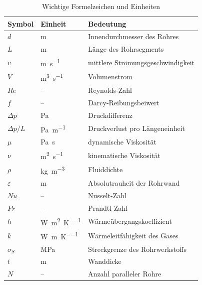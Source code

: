 ﻿\documentclass[12pt,a4paper,twoside]{article}
\theoremstyle{plain}
\theoremstyle{definition}
\theoremstyle{remark}
\newcommand{\Rey}{\mathit{Re}}
\newcommand{\Nus}{\mathit{Nu}}
\newcommand{\Pra}{\mathit{Pr}}
\newcommand{\dpL}{\Delta p / L}
\begin{document}
\begin{table}[htbp]
\centering
\caption{Wichtige Formelzeichen und Einheiten}
\label{tab:nomenklatur}
\begin{tabularx}{\linewidth}{@{}llX@{}}
\toprule
Symbol & Einheit & Bedeutung \\
\midrule
$d$     & \si{\metre}                 & Innendurchmesser des Rohres \\
$L$     & \si{\metre}                 & Länge des Rohrsegments \\
$v$     & \si{\metre\per\second}      & mittlere Strömungsgeschwindigkeit \\
$\dot{V}$ & \si{\metre\cubed\per\second} & Volumenstrom \\
$\Rey$  & --                          & Reynolds-Zahl \\
$f$     & --                          & Darcy-Reibungsbeiwert \\
$\Delta p$ & \si{\pascal}            & Druckdifferenz \\
$\dpL$  & \si{\pascal\per\metre}      & Druckverlust pro Längeneinheit \\
$\mu$   & \si{\pascal\second}         & dynamische Viskosität \\
$\nu$   & \si{\metre\squared\per\second} & kinematische Viskosität \\
$\rho$  & \si{\kilogram\per\metre\cubed} & Fluiddichte \\
$\varepsilon$ & \si{\metre}          & Absolutrauheit der Rohrwand \\
$\Nus$  & --                          & Nusselt-Zahl \\
$\Pra$  & --                          & Prandtl-Zahl \\
$h$     & \si{\watt\per\metre\squared\per\kelvin} & Wärmeübergangskoeffizient \\
$k$     & \si{\watt\per\metre\per\kelvin}  & Wärmeleitfähigkeit des Gases \\
$\sigma_S$ & \si{\mega\pascal}        & Streckgrenze des Rohrwerkstoffs \\
$t$     & \si{\metre}                 & Wanddicke \\
$N$     & --                          & Anzahl paralleler Rohre \\
\bottomrule
\end{tabularx}
\end{table}
\end{document}
